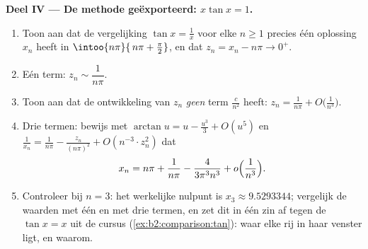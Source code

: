 \begin{problem}
\medskip
\noindent\textbf{Deel IV --- De methode geëxporteerd: $x\tan x =
1$.}
\begin{enumerate}[resume]
  \item Toon aan dat de vergelijking $\tan x = \frac1x$ voor elke
        $n \geq 1$ precies één oplossing $x_n$ heeft in
        $\intoo{n\pi}{\,n\pi + \frac\pi2}$, en dat $z_n = x_n -
        n\pi \to 0^+$.
  \item Eén term: $z_n \sim \dfrac{1}{n\pi}$.
  \item Toon aan dat de ontwikkeling van $z_n$ \emph{geen} term
        $\frac{c}{n^2}$ heeft: $z_n = \frac1{n\pi} +
        O\bigl(\frac{1}{n^3}\bigr)$.
  \item Drie termen: bewijs met $\arctan u = u - \frac{u^3}3 +
        O(u^5)$ en $\frac1{x_n} = \frac{1}{n\pi} -
        \frac{z_n}{(n\pi)^2} + O(n^{-3}\cdot z_n^2)$ dat
        \[
        x_n = n\pi + \frac{1}{n\pi} -
        \frac{4}{3\pi^3 n^3} + o\Bigl(\frac{1}{n^3}\Bigr).
        \]
  \item Controleer bij $n = 3$: het werkelijke nulpunt is $x_3
        \approx 9.5293344$; vergelijk de waarden met één en met
        drie termen, en zet dit in één zin af tegen de $\tan x =
        x$ uit de cursus (\cref{ex:b2:comparison:tan}): waar elke
        rij in haar venster ligt, en waarom.
\end{enumerate}


\end{problem}
